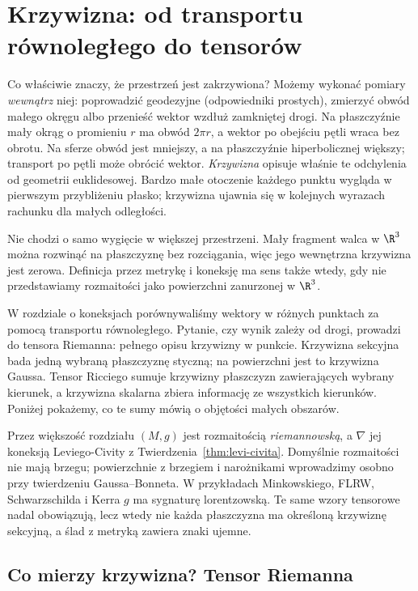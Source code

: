 \chapter{Krzywizna: od transportu równoległego do tensorów}
\label{ch:krzywizna}

\providecommand{\atlasref}[2]{#2}

Co właściwie znaczy, że przestrzeń jest zakrzywiona?
Możemy wykonać pomiary \emph{wewnątrz} niej: poprowadzić
geodezyjne (odpowiedniki prostych), zmierzyć obwód małego
okręgu albo przenieść wektor wzdłuż zamkniętej drogi.
Na płaszczyźnie mały okrąg o promieniu $r$ ma obwód
$2\pi r$, a wektor po obejściu pętli wraca bez obrotu.
Na sferze obwód jest mniejszy, a na płaszczyźnie
hiperbolicznej większy; transport po pętli może obrócić
wektor. \emph{Krzywizna} opisuje właśnie te odchylenia
od geometrii euklidesowej. Bardzo małe otoczenie
każdego punktu wygląda w pierwszym przybliżeniu
płasko; krzywizna ujawnia się w kolejnych wyrazach
rachunku dla małych odległości.

Nie chodzi o samo wygięcie w większej przestrzeni.
Mały fragment walca w $\R^3$ można rozwinąć na płaszczyznę
bez rozciągania, więc jego wewnętrzna krzywizna jest
zerowa. Definicja przez metrykę i koneksję ma sens
także wtedy, gdy nie przedstawiamy rozmaitości jako
powierzchni zanurzonej w $\R^3$.

W rozdziale o koneksjach porównywaliśmy wektory w różnych
punktach za pomocą transportu równoległego. Pytanie,
czy wynik zależy od drogi, prowadzi do tensora Riemanna:
pełnego opisu krzywizny w punkcie. Krzywizna sekcyjna
bada jedną wybraną płaszczyznę styczną; na powierzchni
jest to krzywizna Gaussa. Tensor Ricciego sumuje
krzywizny płaszczyzn zawierających wybrany kierunek,
a krzywizna skalarna zbiera informację ze wszystkich
kierunków. Poniżej pokażemy, co te sumy mówią o
objętości małych obszarów.

Przez większość rozdziału $(M,g)$ jest rozmaitością
\emph{riemannowską}, a $\nabla$ jej koneksją Leviego-Civity
z Twierdzenia~\ref{thm:levi-civita}. Domyślnie rozmaitości
nie mają brzegu; powierzchnie z brzegiem i narożnikami
wprowadzimy osobno przy twierdzeniu Gaussa--Bonneta. W przykładach
Minkowskiego, FLRW, Schwarzschilda i Kerra
$g$ ma sygnaturę lorentzowską.
Te same wzory tensorowe nadal obowiązują, lecz wtedy
nie każda płaszczyzna ma określoną krzywiznę sekcyjną,
a ślad z metryką zawiera znaki ujemne.

\section{Co mierzy krzywizna? Tensor Riemanna}

